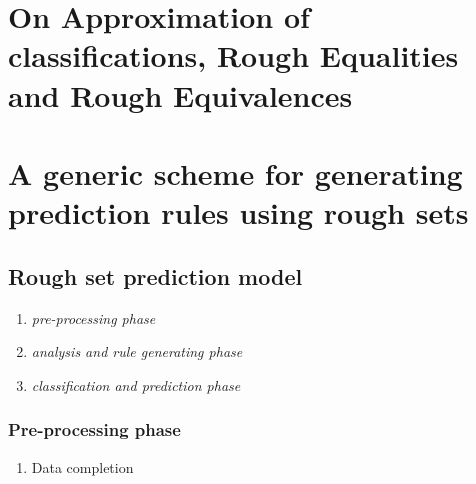 \documentclass[11pt]{article}
\begin{document}
\section{On Approximation of classifications, Rough Equalities and Rough Equivalences}
\label{sec:org915da28}
\section{A generic scheme for generating prediction rules using rough sets}
\label{sec:org9e22b6b}
\subsection{Rough set prediction model}
\label{sec:org314f194}
\begin{enumerate}
\item \emph{pre-processing phase}
\item \emph{analysis and rule generating phase}
\item \emph{classification and prediction phase}
\end{enumerate}
\subsubsection{Pre-processing phase}
\label{sec:org031527d}
\begin{enumerate}
\item Data completion
\label{sec:org2ea8615}
\end{enumerate}
\end{document}
